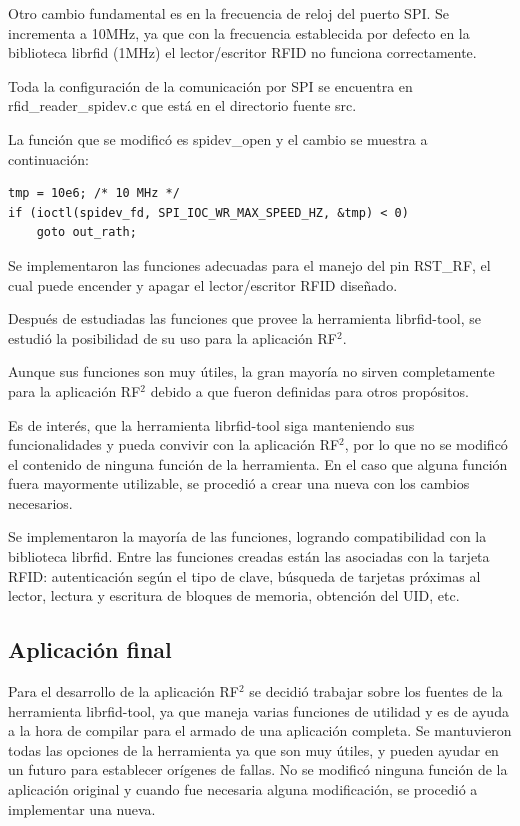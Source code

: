 \bigskip
Otro cambio fundamental es en la frecuencia de reloj del puerto SPI. Se incrementa a 10MHz, ya que con la frecuencia establecida por defecto en la biblioteca librfid (1MHz) el lector/escritor RFID no funciona correctamente. 

Toda la configuración de la comunicación por SPI se encuentra en rfid\_reader\_spidev.c que está en el directorio fuente src.

La función que se modificó es spidev\_open y el cambio se muestra a continuación:

\begin{verbatim}
tmp = 10e6; /* 10 MHz */
if (ioctl(spidev_fd, SPI_IOC_WR_MAX_SPEED_HZ, &tmp) < 0)
    goto out_rath;
\end{verbatim}

Se implementaron las funciones adecuadas  para el manejo del pin RST\_RF, el cual puede encender y apagar el lector/escritor RFID diseñado.

\bigskip
Después de estudiadas las funciones que provee la herramienta librfid-tool, se estudió la posibilidad de su uso para la aplicación RF$^{2}$. 

Aunque sus funciones  son muy útiles, la gran mayoría no sirven completamente para la aplicación RF$^{2}$ debido a que fueron definidas para otros propósitos. 

Es de interés, que la herramienta librfid-tool siga manteniendo sus funcionalidades y pueda convivir con la aplicación RF$^{2}$, por lo que no se modificó el contenido de ninguna función de la herramienta. En el caso que alguna función fuera mayormente utilizable, se procedió a crear una nueva con los cambios necesarios.

Se implementaron la mayoría de las funciones, logrando compatibilidad con la biblioteca librfid. Entre las funciones creadas están las asociadas con la tarjeta RFID: autenticación según el tipo de clave, búsqueda de tarjetas próximas al lector, lectura y escritura de bloques de memoria, obtención del UID, etc.

\subsection{Aplicación final}

Para el desarrollo de la aplicación RF$^{2}$ se decidió trabajar sobre los fuentes de la herramienta librfid-tool, ya que maneja varias funciones de utilidad y es de ayuda a la hora de compilar para el armado de una aplicación completa. Se mantuvieron todas las opciones de la herramienta ya que son muy útiles, y pueden ayudar en un futuro para establecer orígenes de fallas. No se modificó ninguna función de la aplicación original y cuando fue necesaria alguna modificación, se procedió a implementar una nueva.

